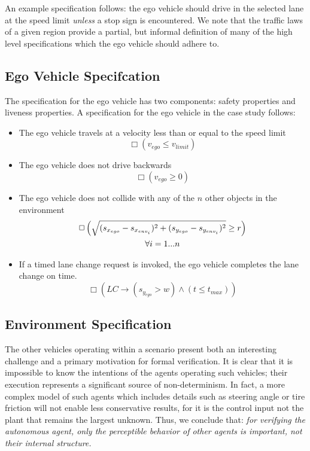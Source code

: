\pagebreak
 An example specification follows: the ego vehicle should drive in the selected lane at the speed limit \emph{unless} a stop sign is encountered. We note that the traffic laws of a given region provide a partial, but informal definition of many of the high level specifications which the ego vehicle should adhere to. 

\subsection{Ego Vehicle Specifcation}
The specification for the ego vehicle has two components: safety properties and liveness properties. A specification for the ego vehicle in the case study follows:
\begin{itemize}
	\item The ego vehicle travels at a velocity less than or equal to the speed limit
	\begin{equation}
		\Box \left(v_{ego} \leq v_{limit}\right)
	\end{equation}
	\item The ego vehicle does not drive backwards
	\begin{equation}
		\Box \left( v_{ego} \geq 0 \right)
	\end{equation}
	\item The ego vehicle does not collide with any of the $n$ other objects in the environment
	\begin{gather}
		\Box \left( \sqrt{(s_{x_{ego}} - s_{x_{env_i}})^2 + (s_{y_{ego}}- s_{y_{env_i}})^2 }  \geq r \right) \notag \\ \forall i = 1...n 
	\end{gather}
	\item If a timed lane change request is invoked, the ego vehicle completes the lane change on time.
	\begin{equation}
		\Box \left( LC \to \left(s_{y_{ego}} > w\right) \wedge \left(t \leq t_{max}\right)\right)
	\end{equation}
\end{itemize}

\subsection{Environment Specification}
The other vehicles operating within a scenario present both an interesting challenge and a primary motivation for formal verification. It is clear that it is impossible to know the intentions of the agents operating such vehicles; their execution represents a significant source of non-determinism. In fact, a more complex model of such agents which includes details such as steering angle or tire friction will not enable less conservative results, for it is the control input not the plant that remains the largest unknown. Thus, we conclude that:
{\it for verifying the autonomous agent, only the perceptible behavior of other agents is important, not their internal structure.}

